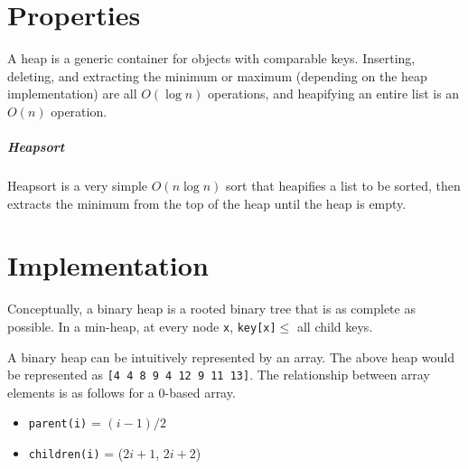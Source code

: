 \documentclass[11pt]{article}
\begin{document}
\section{Properties}
	A heap is a generic container for objects with comparable keys. Inserting, deleting, and extracting the minimum or maximum (depending on the heap implementation) are all $O(\log n)$ operations, and heapifying an entire list is an $O(n)$ operation.
	
	\subparagraph{Heapsort} Heapsort is a very simple $O(n\log n)$ sort that heapifies a list to be sorted, then extracts the minimum from the top of the heap until the heap is empty.
	
\section{Implementation}
	Conceptually, a binary heap is a rooted binary tree that is as complete as possible. In a min-heap, at every node \verb|x|, \verb|key[x]|$\leq$ all child keys.
	
	\begin{center}
	\end{center}
	A binary heap can be intuitively represented by an array. The above heap would be represented as \verb|[4 4 8 9 4 12 9 11 13]|. The relationship between array elements is as follows for a 0-based array.
	\begin{itemize}
		\item {}\verb|parent(i)| = $(i-1)/2$
		\item \verb|children(i)| = ($2i + 1$, $2i + 2$)
	\end{itemize}
	
\end{document}
